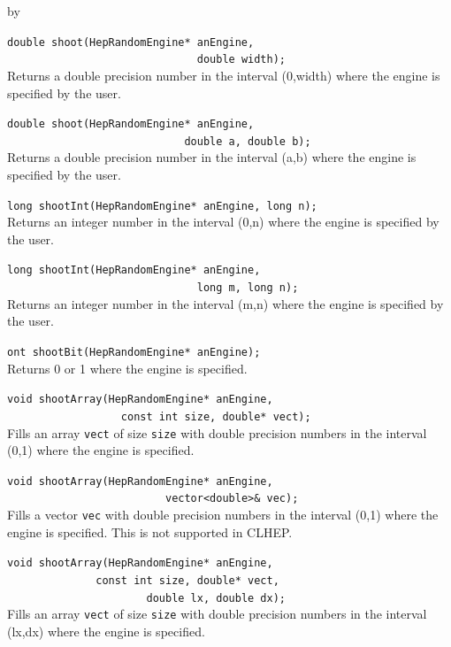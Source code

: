 \documentclass[twoside]{article}
\newcommand{\comp}[1]{\texttt{#1}}%
\newcommand{\entrylabel}[1]{\mbox{\textbf{{#1}}}\hfil}%
\newenvironment{entry}
{\begin{list}{}%
    {\renewcommand{\makelabel}{\entrylabel}%
     \setlength{\labelwidth}{90pt}%
     \setlength{\leftmargin}{\labelwidth}
     \advance\leftmargin by \labelsep%
      }%
    }%
  {\end{list}}
\newcommand{\Entrylabel}[1]%
{\raisebox{0pt}[1ex][0pt]{\makebox[\labelwidth][l]%
    {\parbox[t]{\labelwidth}{\hspace{0pt}\textbf{{#1}}}}}}
\newenvironment{Entry}%
{\renewcommand{\entrylabel}{\Entrylabel}\begin{entry}}%
  {\end{entry}}
\begin{document}
\begin{description}
\begin{Entry}
    \verb+double shoot(HepRandomEngine* anEngine,+\\
    \verb+                              double width);+\\
    Returns a double precision number in the interval (0,width)
    where the engine is specified by the user.
    
    \verb+double shoot(HepRandomEngine* anEngine,+\\
    \verb+                            double a, double b);+\\
    Returns a double precision number in the interval (a,b)
    where the engine is specified by the user.
    
    \verb+long shootInt(HepRandomEngine* anEngine, long n);+\\
    Returns an integer number in the interval (0,n)
    where the engine is specified by the user.
    
    \verb+long shootInt(HepRandomEngine* anEngine,+\\
    \verb+                              long m, long n);+\\
    Returns an integer number in the interval (m,n)
    where the engine is specified by the user.
    
    \verb+ont shootBit(HepRandomEngine* anEngine);+\\
    Returns 0 or 1 where the engine is specified.
    
    \verb+void shootArray(HepRandomEngine* anEngine,+\\
    \verb+                  const int size, double* vect);+\\
    Fills an array \comp{vect} of size \comp{size} with double
    precision numbers in the interval (0,1) where the engine is
    specified.

    \verb+void shootArray(HepRandomEngine* anEngine,+\\
    \verb+                         vector<double>& vec);+\\
    Fills a vector \comp{vec} with double
    precision numbers in the interval (0,1) where the engine is
    specified.  This is not supported in CLHEP.
    
   \verb+void shootArray(HepRandomEngine* anEngine,+\\ 
   \verb+              const int size, double* vect,+\\
   \verb+                      double lx, double dx);+\\
   Fills an array \comp{vect} of size \comp{size} with double
   precision numbers in the interval (lx,dx) where the engine is
   specified.


\end{Entry}
\end{description}
\end{document}
